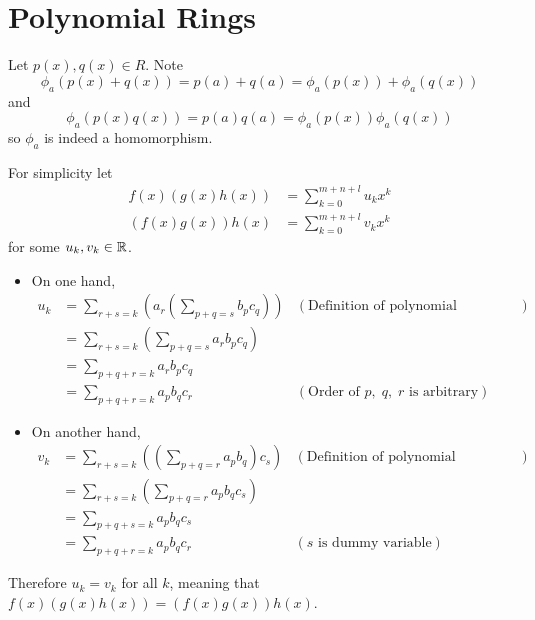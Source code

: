 \section{Polynomial Rings}
\begin{questions}
    \item Let $p(x), q(x) \in R$. Note
    \[
        \phi_a(p(x)+q(x)) = p(a) + q(a) = \phi_a(p(x)) + \phi_a(q(x))
    \]
    and
    \[
        \phi_a(p(x)q(x)) = p(a)q(a) = \phi_a(p(x))\phi_a(q(x))
    \]
    so $\phi_a$ is indeed a homomorphism.

    \item For simplicity let
    \begin{align*}
        f(x)(g(x)h(x)) &= \sum_{k=0}^{m+n+l}u_kx^k\\
        (f(x)g(x))h(x) &= \sum_{k=0}^{m+n+l}v_kx^k
    \end{align*}
    for some $u_k, v_k \in \mathbb{R}$.
    \begin{itemize}
        \item On one hand,
        \begin{align*}
            u_k &= \sum_{r+s=k}\left(a_r\left(\sum_{p+q=s}b_pc_q\right)\right) & (\text{Definition of polynomial multiplication})\\
            &= \sum_{r+s=k}\left(\sum_{p+q=s}a_rb_pc_q\right)\\
            &= \sum_{p+q+r=k}a_rb_pc_q\\
            &= \sum_{p+q+r=k}a_pb_qc_r & (\text{Order of }p,\;q,\;r \text{ is arbitrary})
        \end{align*}

        \item On another hand,
        \begin{align*}
            v_k &= \sum_{r+s=k}\left(\left(\sum_{p+q=r}a_pb_q\right)c_s\right) & (\text{Definition of polynomial multiplication})\\
            &= \sum_{r+s=k}\left(\sum_{p+q=r}a_pb_qc_s\right)\\
            &= \sum_{p+q+s=k}a_pb_qc_s\\
            &= \sum_{p+q+r=k}a_pb_qc_r & (s\text{ is dummy variable})
        \end{align*}
    \end{itemize}
    Therefore $u_k = v_k$ for all $k$, meaning that $f(x)(g(x)h(x)) = (f(x)g(x))h(x)$.


\end{questions}
